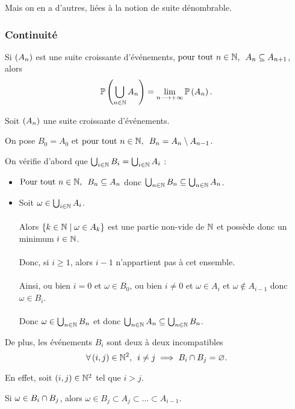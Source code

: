 Mais on en a d'autres, liées à la notion de suite dénombrable.

\subsubsection{Continuité}

\begin{prop}
Si \(\left(A_n\right)\) est une suite croissante d'événements, \cad \(\quantifs{\tpt n\in\N}A_n\subset A_{n+1}\), alors \[\mathbb{P}\left(\bigcup_{n\in\mathbb{N}}A_n\right)=\lim_{n\longrightarrow+\infty}\mathbb{P}\left(A_n\right).\]
\end{prop}

\begin{dem}
Soit \(\left(A_n\right)\) une suite croissante d'événements.

On pose \(B_0=A_0\) et \(\quantifs{\tpt n\in\N}B_n=A_n\excluant A_{n-1}\).

On vérifie d'abord que \(\bigcup_{i\in\mathbb{N}}B_i=\bigcup_{i\in\mathbb{N}}A_i\) : \begin{itemize}
    \item \(\quantifs{\Tpt n\in\N}B_n\subset A_n\) donc \(\bigcup_{n\in\mathbb{N}}B_n\subseteq\bigcup_{n\in\mathbb{N}}A_n\). \\
    \item Soit \(\omega\in\bigcup_{i\in\mathbb{N}}A_i\). \\\\ Alors \(\left\lbrace k\in\mathbb{N}\;\middle|\;\omega\in A_k\right\rbrace\) est une partie non-vide de \(\mathbb{N}\) et possède donc un minimum \(i\in\mathbb{N}\). \\\\ Donc, si \(i\geq1\), alors \(i-1\) n'appartient pas à cet ensemble. \\\\ Ainsi, ou bien \(i=0\) et \(\omega\in B_0\), ou bien \(i\not=0\) et \(\omega\in A_i\) et \(\omega\not\in A_{i-1}\) donc \(\omega\in B_i\). \\\\ Donc \(\omega\in\bigcup_{n\in\mathbb{N}}B_n\) et donc \(\bigcup_{n\in\mathbb{N}}A_n\subseteq\bigcup_{n\in\mathbb{N}}B_n\). \\
\end{itemize}

De plus, les événements \(B_i\) sont deux à deux incompatibles \ie \[\quantifs{\forall\paren{i,j}\in\N^2}i\not=j\imp B_i\inter B_j=\ensvide.\]

En effet, soit \(\left(i,j\right)\in\mathbb{N}^2\) tel que \(i>j\).

Si \(\omega\in B_i\cap B_j\), alors \(\omega\in B_j\subset A_j\subset\dots\subset A_{i-1}\).


\end{dem}
